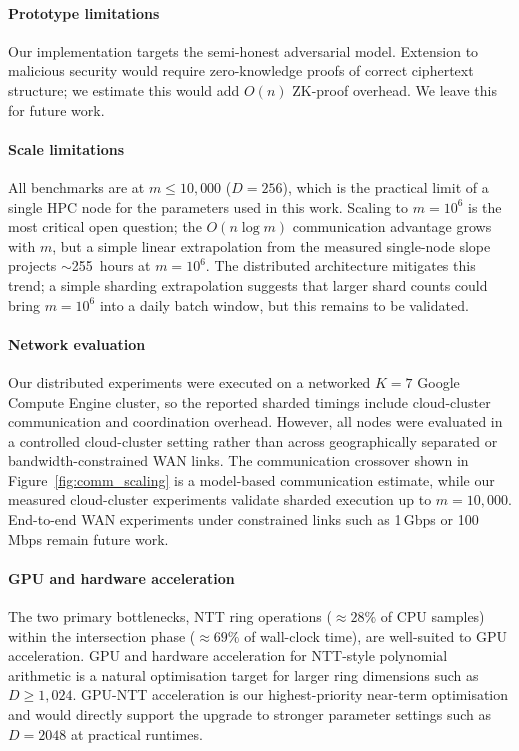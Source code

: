 \documentclass[preprint,12pt]{elsarticle}
\begin{document}
\paragraph{Prototype limitations}
Our implementation targets the semi-honest adversarial model. Extension to
malicious security would require zero-knowledge proofs of correct ciphertext
structure; we estimate this would add $O(n)$ ZK-proof overhead. We leave this
for future work.

\paragraph{Scale limitations}
All benchmarks are at $m \leq 10{,}000$ ($D=256$), which is the practical
limit of a single HPC node for the parameters used in this work. Scaling to
$m = 10^6$ is the most critical open question; the $O(n \log m)$
communication advantage grows with $m$, but a simple linear extrapolation
from the measured single-node slope projects $\sim$255~hours at $m=10^6$.
The distributed architecture mitigates this trend; a simple sharding
extrapolation suggests that larger shard counts could bring $m=10^6$ into a
daily batch window, but this remains to be validated.

\paragraph{Network evaluation}
Our distributed experiments were executed on a networked $K=7$ Google Compute
Engine cluster, so the reported sharded timings include cloud-cluster
communication and coordination overhead. However, all nodes were evaluated in
a controlled cloud-cluster setting rather than across geographically separated
or bandwidth-constrained WAN links. The communication crossover shown in
Figure~\ref{fig:comm_scaling} is a model-based communication estimate,
while our measured cloud-cluster experiments validate sharded execution up to
$m=10{,}000$. End-to-end WAN experiments under constrained links such as
1\,Gbps or 100\,Mbps remain future work.

\paragraph{GPU and hardware acceleration}
The two primary bottlenecks, NTT ring operations ($\approx 28\%$ of CPU
samples) within the intersection phase ($\approx 69\%$ of wall-clock
time), are well-suited to GPU acceleration.
GPU and hardware acceleration for NTT-style polynomial arithmetic is a
natural optimisation target for larger ring dimensions such as $D \geq
1{,}024$. GPU-NTT acceleration is our highest-priority near-term
optimisation and would directly support the upgrade to stronger parameter
settings such as $D=2048$ at practical runtimes.
\end{document}
